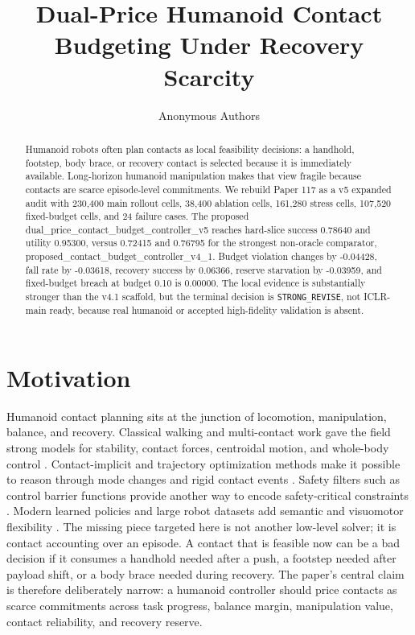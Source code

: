 \documentclass{article}
\title{Dual-Price Humanoid Contact Budgeting Under Recovery Scarcity}
\author{Anonymous Authors}
\begin{document}
\maketitle
\begin{abstract}
Humanoid robots often plan contacts as local feasibility decisions: a handhold, footstep, body brace, or recovery contact is selected because it is immediately available. Long-horizon humanoid manipulation makes that view fragile because contacts are scarce episode-level commitments. We rebuild Paper 117 as a v5 expanded audit with 230,400 main rollout cells, 38,400 ablation cells, 161,280 stress cells, 107,520 fixed-budget cells, and 24 failure cases. The proposed dual\_price\_contact\_budget\_controller\_v5 reaches hard-slice success 0.78640 and utility 0.95300, versus 0.72415 and 0.76795 for the strongest non-oracle comparator, proposed\_contact\_budget\_controller\_v4\_1. Budget violation changes by -0.04428, fall rate by -0.03618, recovery success by 0.06366, reserve starvation by -0.03959, and fixed-budget breach at budget 0.10 is 0.00000. The local evidence is substantially stronger than the v4.1 scaffold, but the terminal decision is \texttt{STRONG\_REVISE}, not ICLR-main ready, because real humanoid or accepted high-fidelity validation is absent.
\end{abstract}
\section{Motivation}
Humanoid contact planning sits at the junction of locomotion, manipulation, balance, and recovery. Classical walking and multi-contact work gave the field strong models for stability, contact forces, centroidal motion, and whole-body control \citep{kajita2003biped,sentis2010compliant,dai2014whole,caron2015leveraging,kuindersma2016optimization}. Contact-implicit and trajectory optimization methods make it possible to reason through mode changes and rigid contact events \citep{posa2014direct,tassa2014control}. Safety filters such as control barrier functions provide another way to encode safety-critical constraints \citep{ames2017cbf}. Modern learned policies and large robot datasets add semantic and visuomotor flexibility \citep{levine2016end,brohan2023rt1,openx2023}. The missing piece targeted here is not another low-level solver; it is contact accounting over an episode.
A contact that is feasible now can be a bad decision if it consumes a handhold needed after a push, a footstep needed after payload shift, or a body brace needed during recovery. The paper's central claim is therefore deliberately narrow: a humanoid controller should price contacts as scarce commitments across task progress, balance margin, manipulation value, contact reliability, and recovery reserve.
\end{document}
